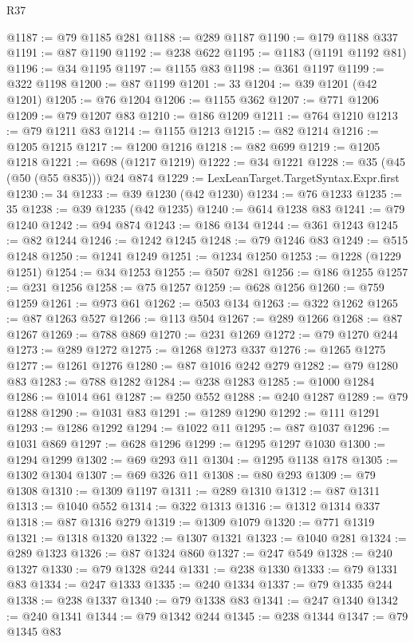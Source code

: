 \begin{lexlean}{R37}
\begin{coremodule}
@1187 := @79 @1185 @281
@1188 := @289 @1187
@1190 := @179 @1188 @337
@1191 := @87 @1190
@1192 := @238 @622
@1195 := @1183 (@1191 @1192 @81)
@1196 := @34 @1195
@1197 := @1155 @83
@1198 := @361 @1197
@1199 := @322 @1198
@1200 := @87 @1199
@1201 := 33
@1204 := @39 @1201 (@42 @1201)
@1205 := @76 @1204
@1206 := @1155 @362
@1207 := @771 @1206
@1209 := @79 @1207 @83
@1210 := @186 @1209
@1211 := @764 @1210
@1213 := @79 @1211 @83
@1214 := @1155 @1213
@1215 := @82 @1214
@1216 := @1205 @1215
@1217 := @1200 @1216
@1218 := @82 @699
@1219 := @1205 @1218
@1221 := @698 (@1217 @1219)
@1222 := @34 @1221
@1228 := @35 (@45 (@50 (@55 @835))) @24 @874
@1229 := LexLeanTarget.TargetSyntax.Expr.first
@1230 := 34
@1233 := @39 @1230 (@42 @1230)
@1234 := @76 @1233
@1235 := 35
@1238 := @39 @1235 (@42 @1235)
@1240 := @614 @1238 @83
@1241 := @79 @1240
@1242 := @94 @874
@1243 := @186 @134
@1244 := @361 @1243
@1245 := @82 @1244
@1246 := @1242 @1245
@1248 := @79 @1246 @83
@1249 := @515 @1248
@1250 := @1241 @1249
@1251 := @1234 @1250
@1253 := @1228 (@1229 @1251)
@1254 := @34 @1253
@1255 := @507 @281
@1256 := @186 @1255
@1257 := @231 @1256
@1258 := @75 @1257
@1259 := @628 @1256
@1260 := @759 @1259
@1261 := @973 @61
@1262 := @503 @134
@1263 := @322 @1262
@1265 := @87 @1263 @527
@1266 := @113 @504
@1267 := @289 @1266
@1268 := @87 @1267
@1269 := @788 @869
@1270 := @231 @1269
@1272 := @79 @1270 @244
@1273 := @289 @1272
@1275 := @1268 @1273 @337
@1276 := @1265 @1275
@1277 := @1261 @1276
@1280 := @87 @1016 @242 @279
@1282 := @79 @1280 @83
@1283 := @788 @1282
@1284 := @238 @1283
@1285 := @1000 @1284
@1286 := @1014 @61
@1287 := @250 @552
@1288 := @240 @1287
@1289 := @79 @1288
@1290 := @1031 @83
@1291 := @1289 @1290
@1292 := @111 @1291
@1293 := @1286 @1292
@1294 := @1022 @11
@1295 := @87 @1037
@1296 := @1031 @869
@1297 := @628 @1296
@1299 := @1295 @1297 @1030
@1300 := @1294 @1299
@1302 := @69 @293 @11
@1304 := @1295 @1138 @178
@1305 := @1302 @1304
@1307 := @69 @326 @11
@1308 := @80 @293
@1309 := @79 @1308
@1310 := @1309 @1197
@1311 := @289 @1310
@1312 := @87 @1311
@1313 := @1040 @552
@1314 := @322 @1313
@1316 := @1312 @1314 @337
@1318 := @87 @1316 @279
@1319 := @1309 @1079
@1320 := @771 @1319
@1321 := @1318 @1320
@1322 := @1307 @1321
@1323 := @1040 @281
@1324 := @289 @1323
@1326 := @87 @1324 @860
@1327 := @247 @549
@1328 := @240 @1327
@1330 := @79 @1328 @244
@1331 := @238 @1330
@1333 := @79 @1331 @83
@1334 := @247 @1333
@1335 := @240 @1334
@1337 := @79 @1335 @244
@1338 := @238 @1337
@1340 := @79 @1338 @83
@1341 := @247 @1340
@1342 := @240 @1341
@1344 := @79 @1342 @244
@1345 := @238 @1344
@1347 := @79 @1345 @83

\end{coremodule}
\end{lexlean}
